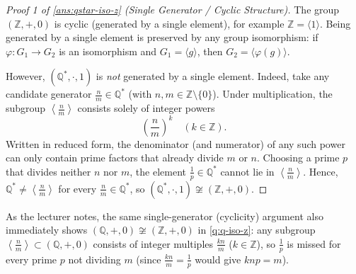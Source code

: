 \begin{content}



\begin{proof}[Proof 1 of \cref{ans:qstar-iso-z} (Single Generator / Cyclic Structure)]
The group $(\mathbb{Z}, +, 0)$ is cyclic (generated by a single element), for example $\mathbb{Z} = \langle 1 \rangle$. Being generated by a single element is preserved by any group isomorphism: if $\varphi \colon G_1 \to G_2$ is an isomorphism and $G_1 = \langle g \rangle$, then $G_2 = \langle \varphi(g) \rangle$.

However, $(\mathbb{Q}^*, \cdot, 1)$ is \emph{not} generated by a single element. Indeed, take any candidate generator $\frac{n}{m} \in \mathbb{Q}^*$ (with $n, m \in \mathbb{Z} \setminus \{0\}$). Under multiplication, the subgroup $\left\langle \frac{n}{m} \right\rangle$ consists solely of integer powers
\[
\left(\frac{n}{m}\right)^k \quad (k \in \mathbb{Z}).
\]
Written in reduced form, the denominator (and numerator) of any such power can only contain prime factors that already divide $m$ or $n$. Choosing a prime $p$ that divides neither $n$ nor $m$, the element $\frac{1}{p} \in \mathbb{Q}^*$ cannot lie in $\left\langle \frac{n}{m} \right\rangle$. Hence, $\mathbb{Q}^* \neq \left\langle \frac{n}{m} \right\rangle$ for every $\frac{n}{m} \in \mathbb{Q}^*$, so $(\mathbb{Q}^*, \cdot, 1) \not\cong (\mathbb{Z}, +, 0)$.
\end{proof}

\begin{steps}
As the lecturer notes, the same single-generator (cyclicity) argument also immediately shows $(\mathbb{Q}, +, 0) \not\cong (\mathbb{Z}, +, 0)$ in \cref{q:q-iso-z}: any subgroup $\left\langle \frac{n}{m} \right\rangle \subset (\mathbb{Q}, +, 0)$ consists of integer multiples $\frac{kn}{m}$ ($k \in \mathbb{Z}$), so $\frac{1}{p}$ is missed for every prime $p$ not dividing $m$ (since $\frac{kn}{m} = \frac{1}{p}$ would give $knp = m$).
\end{steps}
\end{content}

